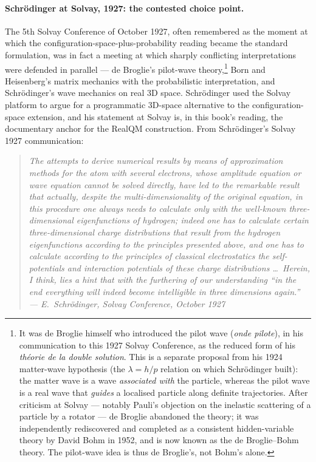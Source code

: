 \paragraph{Schr\"odinger at Solvay, 1927: the contested choice point.}\label{par:solvay-1927}
The 5th Solvay Conference of October 1927, often remembered as the moment at which the configuration-space-plus-probability reading became the standard formulation, was in fact a meeting at which sharply conflicting interpretations were defended in parallel --- de Broglie's pilot-wave theory,\footnote{It was de Broglie himself who introduced the pilot wave (\emph{onde pilote}), in his communication to this 1927 Solvay Conference, as the reduced form of his \emph{th\'eorie de la double solution}. This is a separate proposal from his 1924 matter-wave hypothesis (the $\lambda = h/p$ relation on which Schr\"odinger built): the matter wave is a wave \emph{associated with} the particle, whereas the pilot wave is a real wave that \emph{guides} a localised particle along definite trajectories. After criticism at Solvay --- notably Pauli's objection on the inelastic scattering of a particle by a rotator --- de Broglie abandoned the theory; it was independently rediscovered and completed as a consistent hidden-variable theory by David Bohm in 1952, and is now known as the de Broglie--Bohm theory. The pilot-wave idea is thus de Broglie's, not Bohm's alone.} Born and Heisenberg's matrix mechanics with the probabilistic interpretation, and Schr\"odinger's wave mechanics on real 3D space. Schr\"odinger used the Solvay platform to argue for a programmatic 3D-space alternative to the configuration-space extension, and his statement at Solvay is, in this book's reading, the documentary anchor for the RealQM construction. From Schr\"odinger's Solvay 1927 communication:
\begin{quote}
\itshape The attempts to derive numerical results by means of approximation methods for the atom with several electrons, whose amplitude equation or wave equation cannot be solved directly, have led to the remarkable result that actually, despite the multi-dimensionality of the original equation, in this procedure one always needs to calculate only with the well-known three-dimensional eigenfunctions of hydrogen; indeed one has to calculate certain three-dimensional charge distributions that result from the hydrogen eigenfunctions according to the principles presented above, and one has to calculate according to the principles of classical electrostatics the self-potentials and interaction potentials of these charge distributions \ldots\ Herein, I think, lies a hint that with the furthering of our understanding ``in the end everything will indeed become intelligible in three dimensions again.'' \normalfont\hfill --- E.~Schr\"odinger, Solvay Conference, October 1927
\end{quote}
